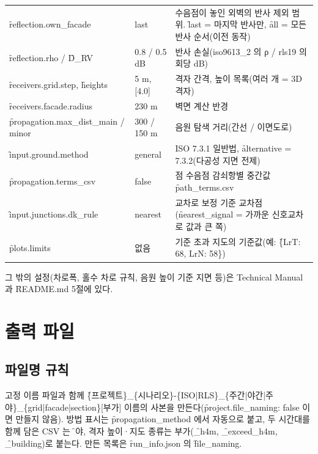 \documentclass[10.5pt,a4paper]{article}
\begin{document}
\begin{longtable}{P{48mm}P{22mm}P{82mm}}
\f{reflection.own\_facade} & last & 수음점이 놓인 외벽의 반사 제외 범위. \f{last} = 마지막 반사만, \f{all} = 모든 반사 순서(이전 동작) \\
\f{reflection.rho} / \f{D\_RV} & 0.8 / 0.5 dB & 반사 손실(iso9613\_2 의 ρ / rls19 의 회당 dB) \\
\f{receivers.grid.step}, \f{heights} & 5 m, [4.0] & 격자 간격, 높이 목록(여러 개 = 3D 격자) \\
\f{receivers.facade.radius} & 230 m & 벽면 계산 반경 \\
\f{propagation.max\_dist\_main / minor} & 300 / 150 m & 음원 탐색 거리(간선 / 이면도로) \\
\f{input.ground.method} & general & ISO 7.3.1 일반법, \f{alternative} = 7.3.2(다공성 지면 전제) \\
\f{propagation.terms\_csv} & false & 점 수음점 감쇠항별 중간값 \f{path\_terms.csv} \\
\f{input.junctions.dk\_rule} & nearest & 교차로 보정 기준 교차점(\f{nearest\_signal} = 가까운 신호교차로 값과 큰 쪽) \\
\f{plots.limits} & 없음 & 기준 초과 지도의 기준값(예: \f{\{LrT: 68, LrN: 58\}}) \\
\bottomrule
\end{longtable}
그 밖의 설정(차로폭, 홀수 차로 규칙, 음원 높이 기준 지면 등)은 Technical Manual 과 \f{README.md} 5절에 있다.

\section{출력 파일}

\subsection{파일명 규칙}
고정 이름 파일과 함께 \f{\{프로젝트\}\_\{시나리오\}-\{ISO|RLS\}\_\{주간|야간|주야\}\_\{grid|facade|section\}[부가]} 이름의 사본을 만든다(\f{project.file\_naming: false} 이면 만들지 않음). 방법 표시는 \f{propagation\_method} 에서 자동으로 붙고, 두 시간대를 함께 담은 CSV 는 \f{주야}, 격자 높이·지도 종류는 부가(\f{\_h4m}, \f{\_exceed\_h4m}, \f{\_building})로 붙는다. 만든 목록은 \f{run\_info.json} 의 \f{file\_naming}.
\end{document}
